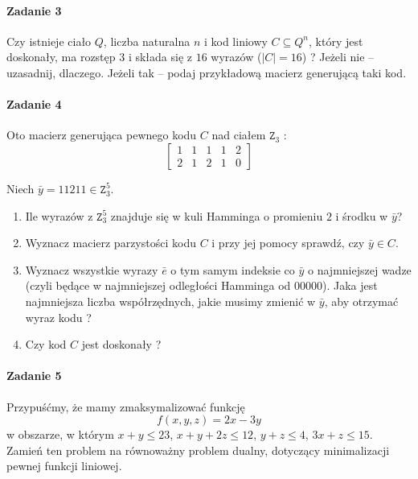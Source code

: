 \documentclass[a4paper,12pt]{article}
\theoremstyle{definition}%
\theoremstyle{definition}
\theoremstyle{problem}
\begin{document}
\paragraph{Zadanie 3} Czy istnieje ciało $Q$, liczba naturalna $n$ i kod liniowy $C \subseteq Q^n$, który jest doskonały, ma rozstęp $3$ i składa się z $16$ wyrazów ($|C| = 16$) ? Jeżeli nie – uzasadnij, dlaczego. Jeżeli tak – podaj przykładową macierz generującą taki kod.

\paragraph{Zadanie 4} Oto macierz generująca pewnego kodu $C$ nad ciałem $\mathtt{Z}_3$ :
$$\begin{bmatrix}
1& 1& 1& 1& 2\\
2& 1& 2& 1& 0
\end{bmatrix}$$

Niech $\bar{y} = 11211 \in \mathtt{Z}^5_3$.
\begin{enumerate}[label=\alph*)]
\item Ile wyrazów z $\mathtt{Z}^5_3$
znajduje się w kuli Hamminga o promieniu $2$ i środku w $\bar{y}$?
\item Wyznacz macierz parzystości kodu $C$ i przy jej pomocy sprawdź, czy $\bar{y} \in C$.
\item Wyznacz wszystkie wyrazy $\bar{e}$ o tym samym indeksie co $\bar{y}$ o najmniejszej wadze (czyli będące w najmniejszej odległości Hamminga od $00000$). Jaka jest najmniejsza liczba współrzędnych, jakie musimy zmienić w $\bar{y}$, aby otrzymać wyraz kodu ?
\item Czy kod $C$ jest doskonały ?
\end{enumerate}

\paragraph{Zadanie 5} Przypuśćmy, że mamy zmaksymalizować funkcję $$f(x, y, z) = 2x - 3y$$ w obszarze, w którym $x + y \leq 23$, $x + y + 2z \leq 12$, $y + z \leq 4$, $3x + z \leq 15$. Zamień ten problem na równoważny problem dualny, dotyczący minimalizacji pewnej funkcji liniowej.
\end{document}
